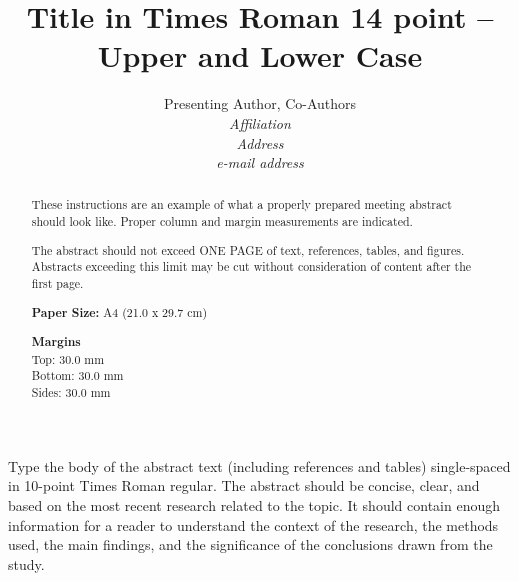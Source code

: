 \documentclass[10pt,a4paper]{article}
\title{Title in Times Roman 14 point – Upper and Lower Case}
\author{Presenting Author, Co-Authors\\
\textit{Affiliation}\\
\textit{Address}\\
\textit{e-mail address}}
\date{} %
\begin{document}
\maketitle

\begin{abstract}
\noindent These instructions are an example of what a properly prepared meeting abstract should look like. Proper column and margin measurements are indicated.

The abstract should not exceed ONE PAGE of text, references, tables, and figures. Abstracts exceeding this limit may be cut without consideration of content after the first page.

\textbf{Paper Size:} A4 (21.0 x 29.7 cm)

\textbf{Margins} \\
Top: 30.0 mm \\
Bottom: 30.0 mm \\
Sides: 30.0 mm
\end{abstract}

\noindent Type the body of the abstract text (including references and tables) single-spaced in 10-point Times Roman regular. The abstract should be concise, clear, and based on the most recent research related to the topic. It should contain enough information for a reader to understand the context of the research, the methods used, the main findings, and the significance of the conclusions drawn from the study.
\end{document}
